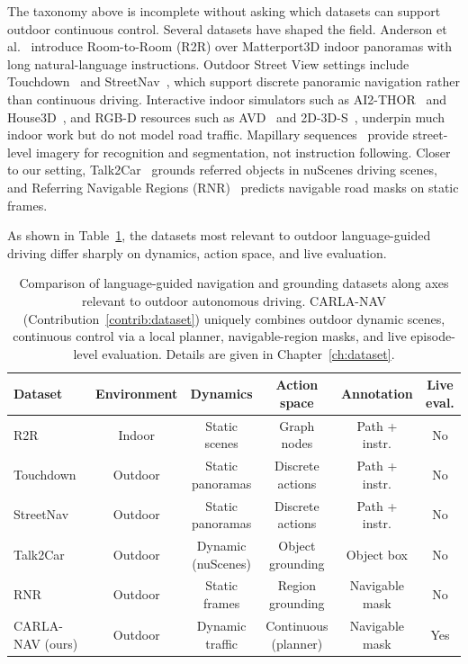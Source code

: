 The taxonomy above is incomplete without asking which datasets can support outdoor continuous control. Several datasets have shaped the field. Anderson et al.~\cite{anderson2018vision} introduce Room-to-Room (R2R) over Matterport3D indoor panoramas with long natural-language instructions. Outdoor Street View settings include Touchdown~\cite{Chen2019TOUCHDOWN} and StreetNav~\cite{mirowski2018learning}, which support discrete panoramic navigation rather than continuous driving. Interactive indoor simulators such as AI2-THOR~\cite{kolve2017ai2} and House3D~\cite{wu2018building}, and RGB-D resources such as AVD~\cite{Ammirato2017dataset} and 2D-3D-S~\cite{armeni2017joint}, underpin much indoor work but do not model road traffic. Mapillary sequences~\cite{warburg2020mapillary,Neuhold2017mapillary} provide street-level imagery for recognition and segmentation, not instruction following. Closer to our setting, Talk2Car~\cite{deruyttere2019talk2car} grounds referred objects in nuScenes driving scenes, and Referring Navigable Regions (RNR)~\cite{Rufus_2021} predicts navigable road masks on static frames.

As shown in Table~\ref{table:dataset_comparison}, the datasets most relevant to outdoor language-guided driving differ sharply on dynamics, action space, and live evaluation.

\begin{table}[ht]
\centering
\scriptsize
\begin{tabular}{@{}lccccc@{}}
\toprule
Dataset & Environment & Dynamics & Action space & Annotation & Live eval. \\
\midrule
R2R~\cite{anderson2018vision} & Indoor & Static scenes & Graph nodes & Path + instr. & No \\
Touchdown~\cite{Chen2019TOUCHDOWN} & Outdoor & Static panoramas & Discrete actions & Path + instr. & No \\
StreetNav~\cite{mirowski2018learning} & Outdoor & Static panoramas & Discrete actions & Path + instr. & No \\
Talk2Car~\cite{deruyttere2019talk2car} & Outdoor & Dynamic (nuScenes) & Object grounding & Object box & No \\
RNR~\cite{Rufus_2021} & Outdoor & Static frames & Region grounding & Navigable mask & No \\
CARLA-NAV (ours) & Outdoor & Dynamic traffic & Continuous (planner) & Navigable mask & Yes \\
\bottomrule
\end{tabular}
\caption[Outdoor language-guided navigation datasets]{Comparison of language-guided navigation and grounding datasets along axes relevant to outdoor autonomous driving. CARLA-NAV (Contribution~\ref{contrib:dataset}) uniquely combines outdoor dynamic scenes, continuous control via a local planner, navigable-region masks, and live episode-level evaluation. Details are given in Chapter~\ref{ch:dataset}.}
\label{table:dataset_comparison}
\end{table}

